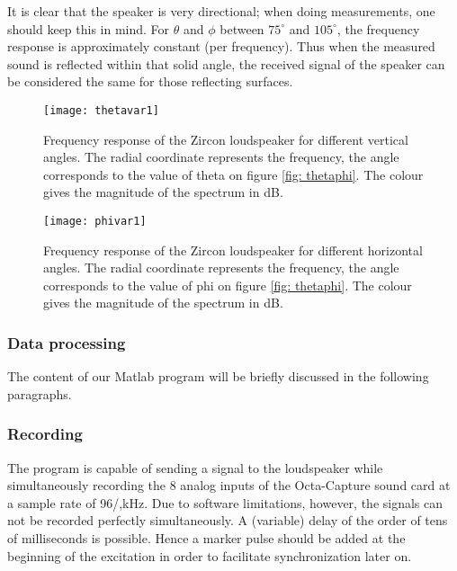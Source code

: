 It is clear that the speaker is very directional; when doing measurements, one should keep this in mind. For $\theta$ and $\phi$ between $75^{\circ}$ and $105^{\circ}$, the frequency response is approximately constant (per frequency). Thus when the measured sound is reflected within that solid angle, the received signal of the speaker can be considered the same for those reflecting surfaces.

\begin{figure}[h!]
  \centering
    \texttt{[image: thetavar1]}
  \caption{Frequency response of the Zircon loudspeaker for different vertical angles. The radial coordinate represents the frequency, the angle corresponds to the value of theta on figure \ref{fig: thetaphi}. The colour gives the magnitude of the spectrum in dB.}
  \label{fig: thetavar}
\end{figure}

\begin{figure}[h!]
  \centering
    \texttt{[image: phivar1]}
  \caption{Frequency response of the Zircon loudspeaker for different horizontal angles. The radial coordinate represents the frequency, the angle corresponds to the value of phi on figure \ref{fig: thetaphi}. The colour gives the magnitude of the spectrum in dB.}
  \label{fig: phivar}
\end{figure}




\subsubsection{Data processing}\label{processing}
The content of our Matlab program will be briefly discussed in the following paragraphs. 
\subsubsection*{Recording}
The program is capable of sending a signal to the loudspeaker while simultaneously recording the 8 analog inputs of the Octa-Capture sound card at a sample rate of 96/,kHz. Due to software limitations, however, the signals can not be recorded perfectly simultaneously. A (variable) delay of the order of tens of  milliseconds is possible. Hence a marker pulse should be added at the beginning of the excitation in order to facilitate synchronization later on.

